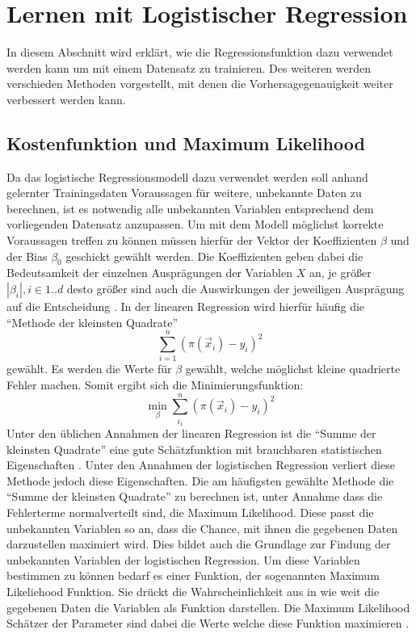 \section{Lernen mit Logistischer Regression}
In diesem Abschnitt wird erklärt, wie die Regressionsfunktion dazu verwendet werden kann um mit einem Datensatz zu trainieren. Des weiteren werden verschieden Methoden vorgestellt, mit denen die Vorhersagegenauigkeit weiter verbessert werden kann.
\subsection{Kostenfunktion und Maximum Likelihood}
Da das logistische Regressionsmodell dazu verwendet werden soll anhand gelernter Trainingsdaten Voraussagen für weitere, unbekannte Daten zu berechnen, ist es notwendig alle unbekannten Variablen entsprechend dem vorliegenden Datensatz anzupassen.
Um mit dem Modell möglichst korrekte Voraussagen treffen zu können müssen hierfür der Vektor der Koeffizienten $\beta$ und der Bias $\beta_0$ geschickt gewählt werden. Die Koeffizienten geben dabei die Bedeutsamkeit der einzelnen Ausprägungen der Variablen $X$ an, je größer $|\beta_i|, i \in 1..d$ desto größer sind auch die Auswirkungen der jeweiligen Ausprägung auf die Entscheidung \cite{FS}.
In der linearen Regression wird hierfür häufig die "`Methode der kleinsten Quadrate"' 
\begin{displaymath}
\sum_{i=1}^n(\pi(\vec x_i)-y_i)^2
\end{displaymath}
gewählt. Es werden die Werte für $\beta$ gewählt, welche möglichst kleine quadrierte Fehler machen. Somit ergibt sich die Minimierungsfunktion: 
\begin{displaymath}
\min_\beta \sum_{i_1}^n (\pi(\vec x_i)-y_i)^2
\end{displaymath}
Unter den üblichen Annahmen der linearen Regression ist die "`Summe der kleinsten Quadrate"' eine gute Schätzfunktion mit brauchbaren statistischen Eigenschaften \cite{WIL}.
Unter den Annahmen der logistischen Regression verliert diese Methode jedoch diese Eigenschaften. Die am häufigsten gewählte Methode die "`Summe der kleinsten Quadrate"' zu berechnen ist, unter Annahme dass die Fehlerterme normalverteilt sind, die Maximum Likelihood. Diese passt die unbekannten Variablen so an, dass die Chance, mit ihnen die gegebenen Daten darzustellen maximiert wird. Dies bildet auch die Grundlage zur Findung der unbekannten Variablen der logistischen Regression. Um diese Variablen bestimmen zu können bedarf es einer Funktion, der sogenannten Maximum Likeliehood Funktion. Sie drückt die Wahrscheinlichkeit aus in wie weit die gegebenen Daten die Variablen als Funktion darstellen. Die Maximum Likelihood Schätzer der Parameter sind dabei die Werte welche diese Funktion maximieren \cite{WIL}.
